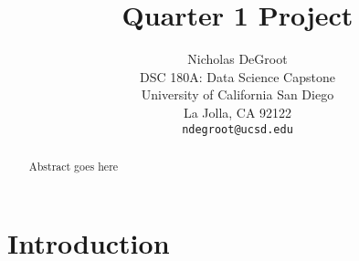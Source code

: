 \documentclass{article} %
\title{Quarter 1 Project}
\author{
Nicholas DeGroot \\
DSC 180A: Data Science Capstone \\
University of California San Diego\\
La Jolla, CA 92122 \\
\texttt{ndegroot@ucsd.edu}
}
\begin{document}
\maketitle

\begin{abstract}

    Abstract goes here

\end{abstract}

\section{Introduction}

{}

\end{document}
